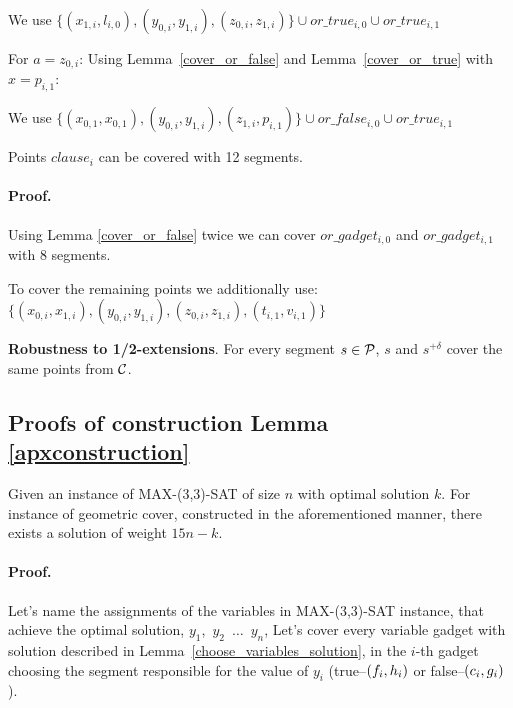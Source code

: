 We use 
$\{ (x_{1, i}, l_{i, 0}), (y_{0, i}, y_{1, i}),
(z_{0, i}, z_{1, i}) \} \cup or\_true_{i, 0} \cup or\_true_{i, 1}$

For $a = z_{0, i}$:
Using Lemma~\ref{cover_or_false} and Lemma~\ref{cover_or_true} with $x = p_{i, 1}$:

We use 
$\{ (x_{0, 1}, x_{0, 1}), (y_{0, i}, y_{1, i}),
(z_{1, i}, p_{i, 1}) \} \cup or\_false_{i, 0} \cup or\_true_{i, 1}$


\begin{lemma}
 Points $clause_i$ can be covered with 12 segments.
\end{lemma}

\paragraph{Proof.}
Using Lemma \ref{cover_or_false} twice we can
cover $or\_gadget_{i,0}$ and  $or\_gadget_{i,1}$
with 8 segments.

To cover the remaining points we additionally use:
$\{ (x_{0, i}, x_{1, i}), (y_{0, i}, y_{1, i}),
(z_{0, i}, z_{1, i}), (t_{i, 1}, v_{i, 1}) \}$

\begin{lemma}
\textbf{Robustness to 1/2-extensions}. For every segment $s \in \mathcal{P}$,
$s$ and $s^{+\delta}$ cover the same points from $\mathcal{C}$.
\end{lemma}

\subsection{Proofs of construction Lemma \ref{apxconstruction}}
\begin{lemma}
	\label{construction_correctness}
	Given an instance of MAX-(3,3)-SAT of size $n$
	with optimal solution $k$.
	For instance of geometric cover, constructed
	in the aforementioned manner, 
	there exists a solution of weight $15n - k$.
\end{lemma}
\paragraph{Proof.}
Let's name the assignments of the variables in MAX-(3,3)-SAT instance,
that achieve the optimal solution,
$y_1$,~$y_2$~$\ldots$~$y_n$,
Let's cover every variable gadget with solution described in
Lemma~\ref{choose_variables_solution},
in the $i$-th gadget choosing the segment responsible for the
value of $y_i$
(true--$(f_i, h_i)$ or false--$(c_i, g_i)$).

